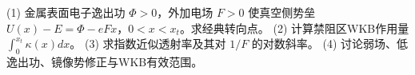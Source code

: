(1) 金属表面电子逸出功 \(\Phi>0\)，外加电场 \(F>0\) 使真空侧势垒 \(U(x)-E=\Phi-eFx\)，\(0<x<x_t\)。求经典转向点。
(2) 计算禁阻区WKB作用量 \(\int_0^{x_t}\kappa(x)dx\)。
(3) 求指数近似透射率及其对 \(1/F\) 的对数斜率。
(4) 讨论弱场、低逸出功、镜像势修正与WKB有效范围。
